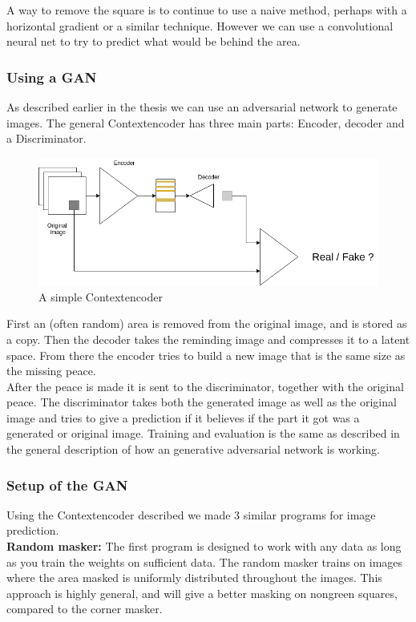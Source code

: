   A way to remove the square is to continue to use a naive method, perhaps with a horizontal gradient or a similar technique. 
  However we can use a convolutional neural net to try to predict what would be behind the area. 
  
  \subsubsection{Using a GAN}
  As described earlier in the thesis %
  we can use an adversarial network to generate images. 
  The general Contextencoder has three main parts: Encoder, decoder and a Discriminator.
  
  \begin{figure}[ht]
    \centering
    \includegraphics[scale=0.5]{methods/figures/Contextencoder.png}
    \caption{A simple Contextencoder}
  \end{figure}
  
  First an (often random) area is removed from the original image, and is stored as a copy. Then the decoder takes the reminding image and compresses it to a latent space. From there 
  the encoder tries to build a new image that is the same size as the missing peace. \\
  After the peace is made it is sent to the discriminator, together with the original peace. The discriminator takes both the generated image as well as the original image and tries to give a prediction if it
  believes if the part it got was a generated or original image.
  Training and evaluation is the same as described in the general description of how an generative adversarial network is working.
  
  \subsubsection{Setup of the GAN}
  Using the Contextencoder described we made 3 %
  similar programs for image prediction.\\
  \vspace{5px}
  \textbf{Random masker:} The first program is designed to work with any data as long as you train the weights on sufficient data. The random masker trains on images where the area masked is 
  uniformly distributed throughout the images. This approach is highly general, and will give a better masking on nongreen squares, compared to the corner masker.  
  
